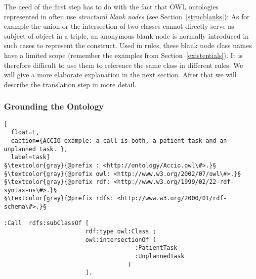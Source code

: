 The need of the first step has to do with the fact that 
OWL ontologies represented in \rdf often use \emph{structural blank nodes} (see Section~\ref{strucblanks}):
As for example the union or the intersection of two classes cannot directly serve as subject of object in a triple, an anonymous blank node is normally introduced in such cases to
represent the construct.
Used in rules, 
these blank node class names have a 
limited scope (remember the examples from Section~\ref{existentials}). It is therefore difficult to use them to reference the same class in different rules. 
We will give a more elaborate explanation in the next section. 
After that we will describe the translation step in more detail.



\subsubsection{Grounding the Ontology}
\begin{lstlisting}[
  float=t,
  caption={ACCIO example: a call is both, a patient task and an unplanned task. },
  label=task]
§\textcolor{gray}{@prefix : <http://ontology/Accio.owl\#>.}§
§\textcolor{gray}{@prefix owl: <http://www.w3.org/2002/07/owl\#>.}§
§\textcolor{gray}{@prefix rdf: <http://www.w3.org/1999/02/22-rdf-syntax-ns\#>.}§
§\textcolor{gray}{@prefix rdfs: <http://www.w3.org/2000/01/rdf-schema\#>.}§

:Call  rdfs:subClassOf [ 
                       rdf:type owl:Class ;
                       owl:intersectionOf ( 
                                     :PatientTask
                                     :UnplannedTask
                                   )
                       ].
\end{lstlisting}


